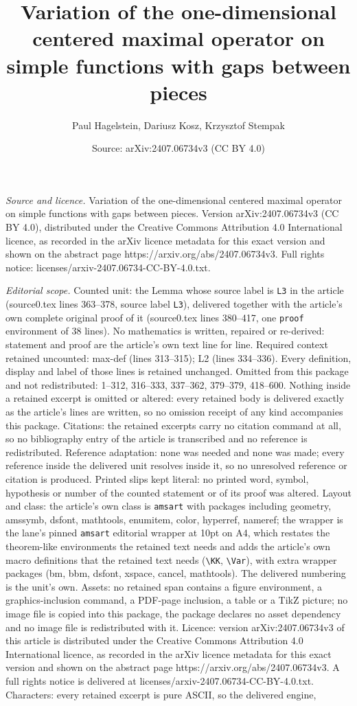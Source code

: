 \documentclass[10pt,a4paper]{amsart}
\title[Variation of the one-dimensional centered maximal operator o]{Variation of the one-dimensional centered maximal operator on simple functions with gaps between pieces}
\author{Paul Hagelstein, Dariusz Kosz, Krzysztof Stempak}
\date{Source: arXiv:2407.06734v3 (CC BY 4.0)}
\begin{document}
\maketitle

\noindent\emph{Source and licence.} Variation of the one-dimensional centered maximal operator on simple functions with gaps between pieces. Version arXiv:2407.06734v3 (CC BY 4.0), distributed under the Creative Commons Attribution 4.0 International licence, as recorded in the arXiv licence metadata for this exact version and shown on the abstract page https://arxiv.org/abs/2407.06734v3. Full rights notice: licenses/arxiv-2407.06734-CC-BY-4.0.txt.\par\smallskip

\noindent\textit{Editorial scope.} Counted unit: the Lemma whose source label is \texttt{L3} in the article (source0.tex lines 363--378, source label \texttt{L3}), delivered together with the article's own complete original proof of it (source0.tex lines 380--417, one \texttt{proof} environment of 38 lines). No mathematics is written, repaired or re-derived: statement and proof are the article's own text line for line. Required context retained uncounted: max-def (lines 313--315); L2 (lines 334--336). Every definition, display and label of those lines is retained unchanged. Omitted from this package and not redistributed: 1--312, 316--333, 337--362, 379--379, 418--600. Nothing inside a retained excerpt is omitted or altered: every retained body is delivered exactly as the article's lines are written, so no omission receipt of any kind accompanies this package. Citations: the retained excerpts carry no citation command at all, so no bibliography entry of the article is transcribed and no reference is redistributed. Reference adaptation: none was needed and none was made; every reference inside the delivered unit resolves inside it, so no unresolved reference or citation is produced. Printed slips kept literal: no printed word, symbol, hypothesis or number of the counted statement or of its proof was altered. Layout and class: the article's own class is \texttt{amsart} with packages including geometry, amssymb, dsfont, mathtools, enumitem, color, hyperref, nameref; the wrapper is the lane's pinned \texttt{amsart} editorial wrapper at 10pt on A4, which restates the theorem-like environments the retained text needs and adds the article's own macro definitions that the retained text needs (\texttt{\textbackslash KK}, \texttt{\textbackslash Var}), with extra wrapper packages (bm, bbm, dsfont, xspace, cancel, mathtools). The delivered numbering is the unit's own. Assets: no retained span contains a figure environment, a graphics-inclusion command, a PDF-page inclusion, a table or a TikZ picture; no image file is copied into this package, the package declares no asset dependency and no image file is redistributed with it. Licence: version arXiv:2407.06734v3 of this article is distributed under the Creative Commons Attribution 4.0 International licence, as recorded in the arXiv licence metadata for this exact version and shown on the abstract page https://arxiv.org/abs/2407.06734v3. A full rights notice is delivered at licenses/arxiv-2407.06734-CC-BY-4.0.txt. Characters: every retained excerpt is pure ASCII, so the delivered engine, 
\end{document}
